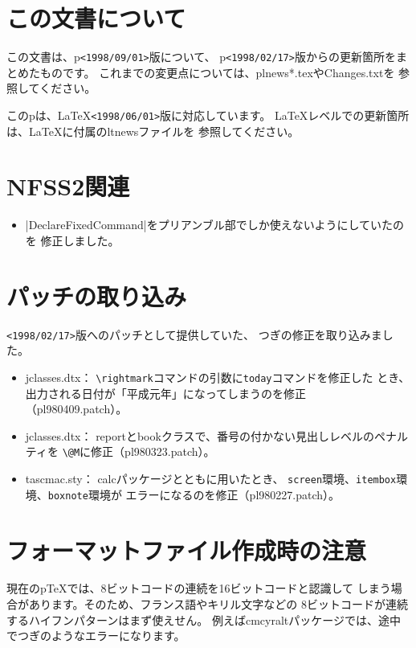 \documentclass{plnews}
\author{中野 賢（\texttt{<ken-na at ascii.co.jp>}）
     \& 富樫 秀昭（\texttt{<hideak-t at ascii.co.jp>}）
}
\begin{document}
\maketitle

\section{この文書について}
この文書は、p\LaTeXe{}\texttt{<1998/09/01>}版について、
p\LaTeXe{}\texttt{<1998/02/17>}版からの更新箇所をまとめたものです。
これまでの変更点については、\textsf{plnews*.tex}やChanges.txtを
参照してください。

このp\LaTeXe{}は、\LaTeX{}\texttt{<1998/06/01>}版に対応しています。
\LaTeX{}レベルでの更新箇所は、\LaTeX{}に付属のltnewsファイルを
参照してください。

\section{NFSS2関連}
\begin{itemize}
\item |DeclareFixedCommand|をプリアンブル部でしか使えないようにしていたのを
修正しました。
\end{itemize}

\section{パッチの取り込み}
\texttt{<1998/02/17>}版へのパッチとして提供していた、
つぎの修正を取り込みました。
\begin{itemize}
\item \textsf{jclasses.dtx}：
	\verb|\rightmark|コマンドの引数に\verb|today|コマンドを修正した
	とき、出力される日付が「平成元年」になってしまうのを修正
	（\textsf{pl980409.patch}）。
\item \textsf{jclasses.dtx}：
	reportとbookクラスで、番号の付かない見出しレベルのペナルティを
	\verb|\@M|に修正（\textsf{pl980323.patch}）。
\item \textsf{tascmac.sty}：
	calcパッケージとともに用いたとき、
	\verb|screen|環境、\verb|itembox|環境、\verb|boxnote|環境が
	エラーになるのを修正（\textsf{pl980227.patch}）。
\end{itemize}



\section{フォーマットファイル作成時の注意}
現在のp\TeX{}では、8ビットコードの連続を16ビットコードと認識して
しまう場合があります。そのため、フランス語やキリル文字などの
8ビットコードが連続するハイフンパターンはまず使えせん。
例えばcmcyraltパッケージでは、途中でつぎのようなエラーになります。
\end{document}
